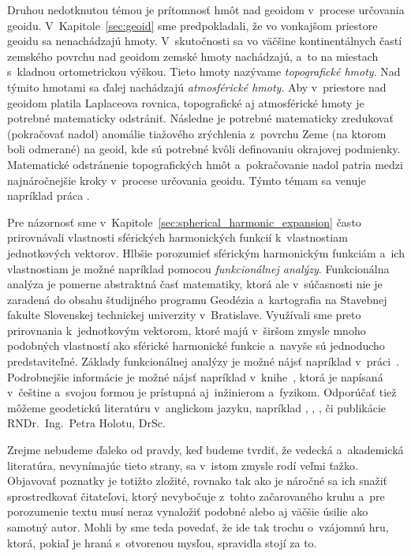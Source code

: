 \documentclass[a4paper, 12pt]{book}
\begin{document}
Druhou nedotknutou témou je prítomnosť hmôt nad geoidom v~procese určovania 
geoidu.  V~Kapitole~\ref{sec:geoid} sme predpokladali, že vo vonkajšom 
priestore geoidu sa nenachádzajú hmoty.  V~skutočnosti sa vo väčšine 
kontinentálnych častí zemského povrchu nad geoidom zemské hmoty nachádzajú, 
a~to na miestach s~kladnou ortometrickou výškou.  Tieto hmoty nazývame 
\emph{topografické hmoty}.  Nad týmito hmotami sa ďalej nachádzajú 
\emph{atmosférické hmoty}.  Aby v~priestore nad geoidom platila Laplaceova 
rovnica, topografické aj atmosférické hmoty je potrebné matematicky odstrániť.  
Následne je potrebné matematicky zredukovať (pokračovať nadol) anomálie 
tiažového zrýchlenia z~povrchu Zeme (na ktorom boli odmerané) na geoid, kde sú 
potrebné kvôli definovaniu okrajovej podmienky.  Matematické odstránenie 
topografických hmôt a~pokračovanie nadol patria medzi najnáročnejšie kroky 
v~procese určovania geoidu.  Týmto témam sa venuje napríklad práca 
\textcite{Janak2006}.

Pre názornosť sme v~Kapitole~\ref{sec:spherical_harmonic_expansion} často 
prirovnávali vlastnosti sférických harmonických funkcií k~vlastnostiam 
jednotkových vektorov.  Hlbšie porozumieť sférickým harmonickým funkciám a~ich 
vlastnostiam je možné napríklad pomocou \emph{funkcionálnej analýzy}.  
Funkcionálna analýza je pomerne abstraktná časť matematiky, ktorá ale 
v~súčasnosti nie je zaradená do obsahu študijného programu Geodézia 
a~kartografia na Stavebnej fakulte Slovenskej technickej univerzity 
v~Bratislave.  Využívali sme preto prirovnania k~jednotkovým vektorom, ktoré 
majú v~širšom zmysle mnoho podobných vlastností ako sférické harmonické funkcie 
a~navyše sú jednoducho predstaviteľné.  Základy funkcionálnej analýzy je možné 
nájsť napríklad v~práci~\textcite{Janak2006}.  Podrobnejšie informácie je možné 
nájsť napríklad v~knihe~\textcite{Rektorys}, ktorá je napísaná v~češtine 
a~svojou formou je prístupná aj~inžinierom a~fyzikom.  Odporúčať tiež môžeme 
geodetickú literatúru v~anglickom jazyku, napríklad 
\textcite{MoritzAdvancedGeodesy}, \textcite{SansoGeoidDetermination}, 
\textcite{Borre2006}, \textcite{Freeden2009} či publikácie RNDr.~Ing.~Petra 
Holotu, DrSc.

Zrejme nebudeme ďaleko od pravdy, keď budeme tvrdiť, že vedecká a~akademická 
literatúra, nevynímajúc tieto strany, sa v~istom zmysle rodí veľmi ťažko.  
Objavovať poznatky je totižto zložité, rovnako tak ako je náročné sa ich snažiť 
sprostredkovať čitateľovi, ktorý nevybočuje z~tohto začarovaného kruhu a~pre 
porozumenie textu musí neraz vynaložiť podobné alebo aj väčšie úsilie ako 
samotný autor.  Mohli by sme teda povedať, že ide tak trochu o~vzájomnú hru, 
ktorá, pokiaľ je hraná s~otvorenou mysľou, spravidla stojí za to.
\end{document}
